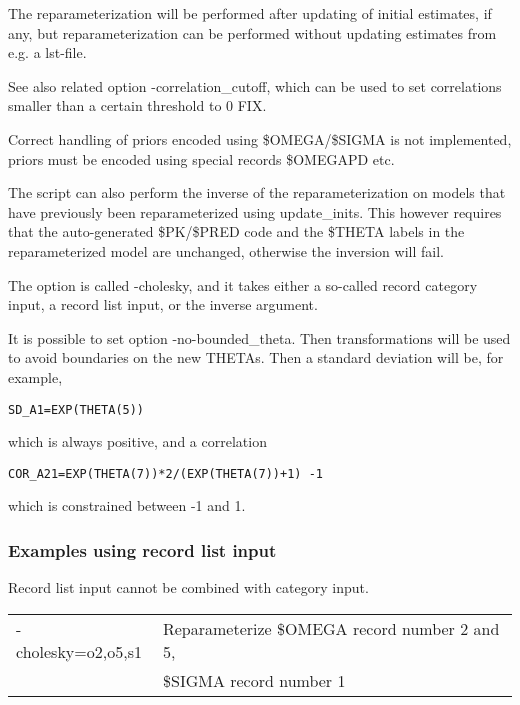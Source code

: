 The reparameterization will be performed after updating of initial estimates, if any, but reparameterization can be performed without updating estimates from e.g. a lst-file.

See also related option -correlation\_cutoff, which can be used to set correlations smaller than a certain threshold to 0 FIX.

Correct handling of priors encoded using \$OMEGA/\$SIGMA is not implemented, priors must be encoded using special records \$OMEGAPD etc.

The script can also perform the inverse of the reparameterization on models that have previously been reparameterized using update\_inits. This however requires that the auto-generated \$PK/\$PRED code and the \$THETA labels in the reparameterized model are unchanged, otherwise the inversion will fail.

The option is called -cholesky, and it takes either a so-called record category input, a record list input, or the inverse argument.

It is possible to set option -no-bounded\_theta. Then transformations will be used to avoid boundaries on the new THETAs. Then
a standard deviation will be, for example, 
\begin{verbatim}
SD_A1=EXP(THETA(5))
\end{verbatim}
which is always positive, and a correlation
\begin{verbatim}
COR_A21=EXP(THETA(7))*2/(EXP(THETA(7))+1) -1
\end{verbatim}
which is constrained between -1 and 1. %
\subsubsection*{Examples using record list input}
Record list input cannot be combined with category input.\\
\begin{tabular}{ll}
	-cholesky=o2,o5,s1 &               Reparameterize \$OMEGA record number 2 and 5,\\
     &  \$SIGMA record number 1\\
\end{tabular}

